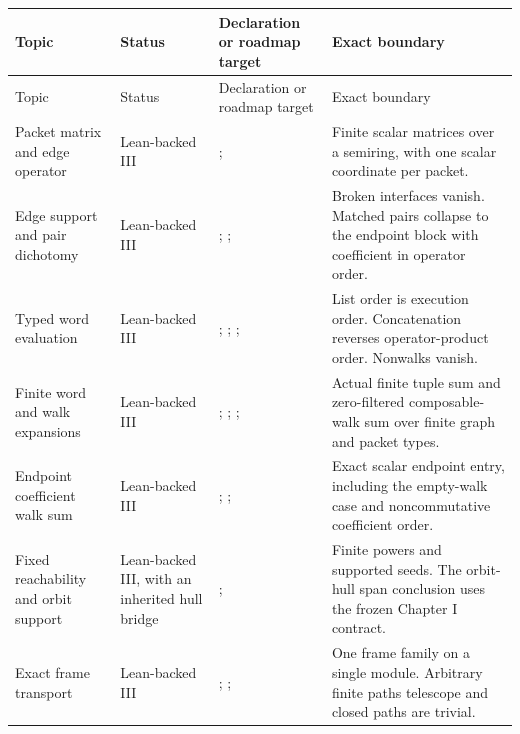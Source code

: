 \small
\begin{longtable}{L{0.17\textwidth}L{0.18\textwidth}L{0.25\textwidth}L{0.22\textwidth}}
\toprule
Topic & Status & Declaration or roadmap target & Exact boundary\\
\midrule
\endfirsthead
\toprule
Topic & Status & Declaration or roadmap target & Exact boundary\\
\midrule
\endhead
Packet matrix and edge operator
& Lean-backed III
& ; 
& Finite scalar matrices over a semiring, with one scalar coordinate per packet.\\
\addlinespace
Edge support and pair dichotomy
& Lean-backed III
& ; ; 
& Broken interfaces vanish. Matched pairs collapse to the endpoint block with coefficient in operator order.\\
\addlinespace
Typed word evaluation
& Lean-backed III
& ; ; ; 
& List order is execution order. Concatenation reverses operator-product order. Nonwalks vanish.\\
\addlinespace
Finite word and walk expansions
& Lean-backed III
& ; ; ; 
& Actual finite tuple sum and zero-filtered composable-walk sum over finite graph and packet types.\\
\addlinespace
Endpoint coefficient walk sum
& Lean-backed III
& ; ; 
& Exact scalar endpoint entry, including the empty-walk case and noncommutative coefficient order.\\
\addlinespace
Fixed reachability and orbit support
& Lean-backed III, with an inherited hull bridge
& ; 
& Finite powers and supported seeds. The orbit-hull span conclusion uses the frozen Chapter I contract.\\
\addlinespace
Exact frame transport
& Lean-backed III
& ; ; 
& One frame family on a single module. Arbitrary finite paths telescope and closed paths are trivial.\\

\end{longtable}
